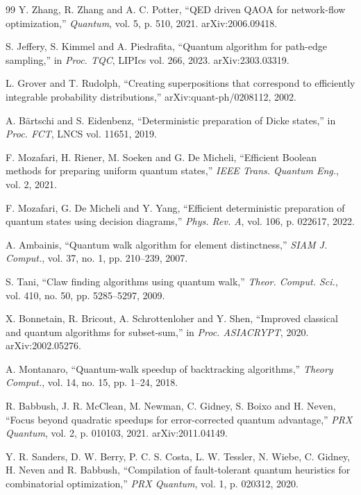 \documentclass[journal]{IEEEtran}
\begin{document}
\begin{thebibliography}{99}
Y. Zhang, R. Zhang and A. C. Potter, ``QED driven QAOA for network-flow optimization,'' \emph{Quantum}, vol. 5, p. 510, 2021. arXiv:2006.09418.

S. Jeffery, S. Kimmel and A. Piedrafita, ``Quantum algorithm for path-edge sampling,'' in \emph{Proc. TQC}, LIPIcs vol. 266, 2023. arXiv:2303.03319.

L. Grover and T. Rudolph, ``Creating superpositions that correspond to efficiently integrable probability distributions,'' arXiv:quant-ph/0208112, 2002.

A. Bärtschi and S. Eidenbenz, ``Deterministic preparation of Dicke states,'' in \emph{Proc. FCT}, LNCS vol. 11651, 2019.

F. Mozafari, H. Riener, M. Soeken and G. De Micheli, ``Efficient Boolean methods for preparing uniform quantum states,'' \emph{IEEE Trans. Quantum Eng.}, vol. 2, 2021.

F. Mozafari, G. De Micheli and Y. Yang, ``Efficient deterministic preparation of quantum states using decision diagrams,'' \emph{Phys. Rev. A}, vol. 106, p. 022617, 2022.

A. Ambainis, ``Quantum walk algorithm for element distinctness,'' \emph{SIAM J. Comput.}, vol. 37, no. 1, pp. 210--239, 2007.

S. Tani, ``Claw finding algorithms using quantum walk,'' \emph{Theor. Comput. Sci.}, vol. 410, no. 50, pp. 5285--5297, 2009.

X. Bonnetain, R. Bricout, A. Schrottenloher and Y. Shen, ``Improved classical and quantum algorithms for subset-sum,'' in \emph{Proc. ASIACRYPT}, 2020. arXiv:2002.05276.

A. Montanaro, ``Quantum-walk speedup of backtracking algorithms,'' \emph{Theory Comput.}, vol. 14, no. 15, pp. 1--24, 2018.

R. Babbush, J. R. McClean, M. Newman, C. Gidney, S. Boixo and H. Neven, ``Focus beyond quadratic speedups for error-corrected quantum advantage,'' \emph{PRX Quantum}, vol. 2, p. 010103, 2021. arXiv:2011.04149.

Y. R. Sanders, D. W. Berry, P. C. S. Costa, L. W. Tessler, N. Wiebe, C. Gidney, H. Neven and R. Babbush, ``Compilation of fault-tolerant quantum heuristics for combinatorial optimization,'' \emph{PRX Quantum}, vol. 1, p. 020312, 2020.


\end{thebibliography}
\end{document}
